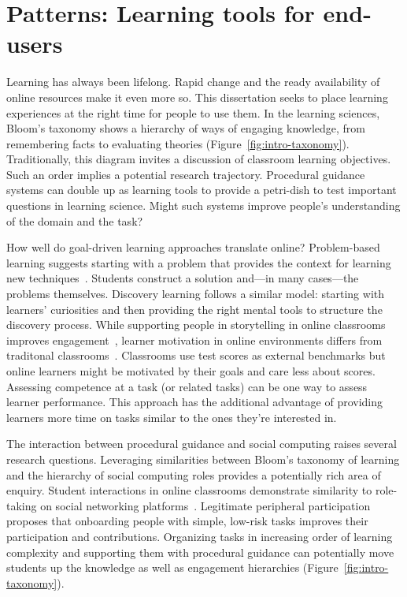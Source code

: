 \section{Patterns: Learning tools for end-users} 
Learning has always been lifelong. Rapid change and the ready availability of online resources make it even more so. This dissertation seeks to place learning experiences at the right time for people to use them. In the learning sciences, Bloom’s taxonomy shows a hierarchy of ways of engaging knowledge, from remembering facts to evaluating theories (Figure~\ref{fig:intro-taxonomy}). Traditionally, this diagram invites a discussion of classroom learning objectives. Such an order implies a potential research trajectory. Procedural guidance systems can double up as learning tools to provide a petri-dish to test important questions in learning science. Might such systems improve people's understanding of the domain and the task?

How well do goal-driven learning approaches translate online? Problem-based learning suggests starting with a problem that provides the context for learning new techniques~\cite{johnson2009breaking}. Students construct a solution and---in many cases---the problems themselves. Discovery learning follows a similar model: starting with learners' curiosities and then providing the right mental tools to structure the discovery process. While supporting people in storytelling in online classrooms improves engagement~\cite{Pandey2015}, learner motivation in online environments differs from traditonal classrooms~\cite{kizilcec2015motivation}. Classrooms use test scores as external benchmarks but online learners might be motivated by their goals and care less about scores. Assessing competence at a task (or related tasks) can be one way to assess learner performance. This approach has the additional advantage of providing learners more time on tasks similar to the ones they're interested in.

The interaction between procedural guidance and social computing raises several research questions. Leveraging similarities between Bloom’s taxonomy of learning and the hierarchy of social computing roles provides a potentially rich area of enquiry. Student interactions in online classrooms demonstrate similarity to role-taking on social networking platforms~\cite{kizilcec2013deconstructing}. Legitimate peripheral participation~\cite{Bryant2005} proposes that onboarding people with simple, low-risk tasks improves their participation and contributions. Organizing tasks in increasing order of learning complexity and supporting them with procedural guidance can potentially move students up the knowledge as well as engagement hierarchies (Figure~\ref{fig:intro-taxonomy}).

